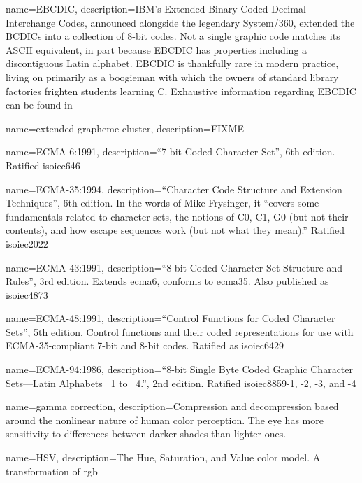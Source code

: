 {
  name={EBCDIC},
  description={IBM's Extended Binary Coded Decimal Interchange Codes, announced
    alongside the legendary System/360, extended the BCDICs into a collection
    of 8-bit codes. Not a single graphic code matches its ASCII equivalent, in
    part because EBCDIC has properties including a discontiguous Latin
    alphabet. EBCDIC is thankfully rare in modern practice, living on primarily
    as a boogieman with which the owners of standard library factories frighten
    students learning C. Exhaustive information regarding EBCDIC can be found
    in \cite{codedcharactersets}}
}

{
  name={extended grapheme cluster},
description={FIXME }
}

{
  name={ECMA-6:1991},
  description={``7-bit Coded Character Set'', 6th edition. Ratified
    \Gls{isoiec646}}
}

{
  name={ECMA-35:1994},
  description={``Character Code Structure and Extension Techniques'', 6th
    edition. In the words of Mike Frysinger, it ``covers some fundamentals
    related to character sets, the notions of \Gls{C0}, C1, G0 (but not their
    contents), and how escape sequences work (but not what they mean)\cite{hterm}.''
    Ratified \Gls{isoiec2022}}
}

{
  name={ECMA-43:1991},
    description={``8-bit Coded Character Set Structure and Rules'', 3rd edition. Extends
      \Gls{ecma6}, conforms to \Gls{ecma35}. Also published as \Gls{isoiec4873}}
}

{
  name={ECMA-48:1991},
  description={``Control Functions for Coded Character Sets'', 5th edition.
    Control functions and their coded representations for use with ECMA-35-compliant
    7-bit and 8-bit codes.
   Ratified as \Gls{isoiec6429}}
}

{
  name={ECMA-94:1986},
  description={``8-bit Single Byte Coded Graphic Character Sets---Latin
    Alphabets \textnumero\ 1 to \textnumero\ 4.'', 2nd edition. Ratified
    \Gls{isoiec8859}-1, -2, -3, and -4}
}

{
  name={gamma correction},
  description={Compression and decompression based around the nonlinear nature
   of human color perception. The eye has more sensitivity to differences between
   darker shades than lighter ones.}
}

{
  name={HSV},
  description={The Hue, Saturation, and Value color model. A transformation of \Gls{rgb}}
}

